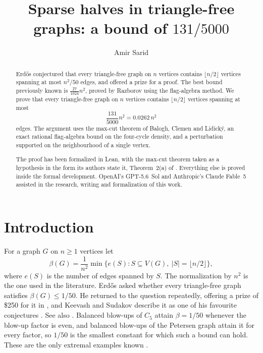 \documentclass[11pt,reqno]{amsart}
\theoremstyle{plain}
\newcommand{\opt}{\beta}
\begin{document}
\title[Sparse halves in triangle-free graphs]
{Sparse halves in triangle-free graphs: a bound of $131/5000$}

\author{Amir Sarid}
\date{}

\begin{abstract}
Erd\H{o}s conjectured that every triangle-free graph on $n$ vertices contains
$\lfloor n/2\rfloor$ vertices spanning at most $n^{2}/50$ edges, and offered a
prize for a proof.  The best bound previously known is $\tfrac{27}{1024}n^{2}$, proved
by Razborov using the flag-algebra method.  We prove that every triangle-free
graph on $n$ vertices contains $\lfloor n/2\rfloor$ vertices spanning at most
\[
 \frac{131}{5000}n^{2}=0.0262\,n^{2}
\]
edges.  The argument uses the max-cut theorem of Balogh, Clemen and
Lidick\'y, an exact rational flag-algebra bound on the four-cycle density, and
a perturbation supported on the neighbourhood of a single vertex.

The proof has been formalized in Lean, with the max-cut theorem taken as a
hypothesis in the form its authors state it, Theorem~2(a) of \cite{bcl}.
Everything else is proved inside the formal development.  OpenAI's
GPT-5.6~Sol and Anthropic's Claude Fable~5 assisted in the research,
writing and formalization of this work.
\end{abstract}

\maketitle

\section{Introduction}

For a graph $G$ on $n\ge1$ vertices let
\[
 \opt(G)=\frac1{n^2}\min\bigl\{e(S):S\subseteq V(G),\
 |S|=\lfloor n/2\rfloor\bigr\},
\]
where $e(S)$ is the number of edges spanned by $S$.  The normalization by
$n^{2}$ is the one used in the literature.  Erd\H{o}s \cite{erdos75} asked whether every triangle-free graph satisfies
$\opt(G)\le1/50$.  He returned to the question repeatedly, offering a prize of
\$250 for it in \cite{erdos97}, and Keevash and Sudakov describe it as one of
his favourite conjectures \cite{keevash-sudakov}.  See also
\cite{erdosproblems}.  Balanced blow-ups of $C_{5}$ attain $\opt=1/50$ whenever the blow-up factor is
even, and balanced blow-ups of the Petersen graph attain it for every factor,
so $1/50$ is the smallest constant for which such a bound can hold.  These are
the only extremal examples known \cite{razborov-halves}.
\end{document}
